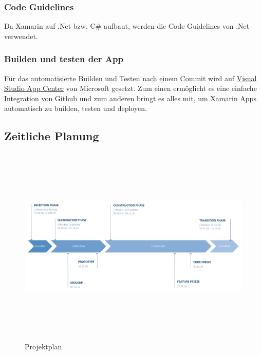 \subsubsection*{Code Guidelines}
Da Xamarin auf .Net bzw. C\# aufbaut, werden die Code Guidelines von .Net verwendet. \cite{guidelines-DotNet}

\subsubsection*{Builden und testen der App}
Für das automatisierte Builden und Testen nach einem Commit wird auf \href{https://appcenter.ms/orgs/BrainingOutOfBox/apps/BrainingOutOfBox-App}{Visual Studio App Center} von Microsoft gesetzt. Zum einen ermöglicht es eine einfache Integration von Github und zum anderen bringt es alles mit, um Xamarin Apps automatisch zu builden, testen und deployen. 

\begin{landscape}
	\thispagestyle{empty}
	\subsection{Zeitliche Planung}
	\label{subsec:timeline}
		\begin{figure}[h]
			\centering
			\includegraphics[width=1\linewidth, height=9.6cm]{img/projekt-plan/projekt-plan}
			\caption[Projektplan]{Projektplan}
			\label{fig:projekt-plan}
		\end{figure}
\end{landscape}